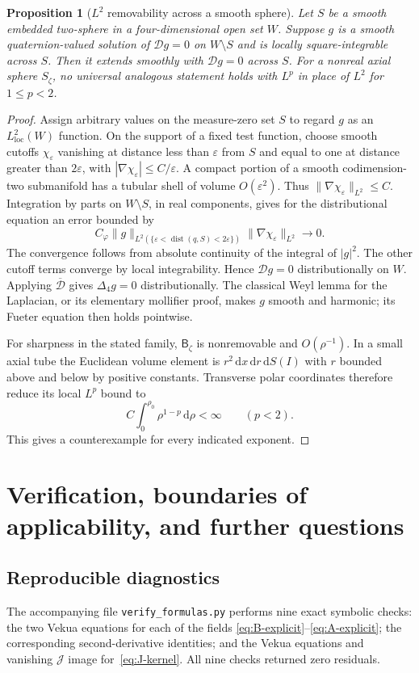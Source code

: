\documentclass[11pt,a4paper]{article}
\numberwithin{equation}{section}
\newtheorem{proposition}[theorem]{Proposition}
\theoremstyle{definition}
\theoremstyle{remark}
\newcommand{\J}{\mathcal J}
\newcommand{\D}{\mathcal D}
\newcommand{\Lap}{\Delta_4}
\newcommand{\dd}{\,\mathrm d}
\newcommand{\dx}{\,\mathrm dx}
\newcommand{\dr}{\,\mathrm dr}
\newcommand{\Bdef}{\mathsf B}
\newcommand{\norm}[1]{\lVert #1\rVert}
\DeclareMathOperator{\dist}{dist}
\begin{document}
\begin{proposition}[$L^2$ removability across a smooth sphere]
\label{prop:L2}
Let $S$ be a smooth embedded two-sphere in a four-dimensional open set
$W$. Suppose $g$ is a smooth quaternion-valued solution of $\D g=0$
on $W\setminus S$ and is locally square-integrable across $S$.
Then it extends smoothly with $\D g=0$ across $S$.
For a nonreal axial sphere $S_\zeta$, no universal analogous statement
holds with $L^p$ in place of $L^2$ for $1\le p<2$.
\end{proposition}
\begin{proof}
Assign arbitrary values on the measure-zero set $S$ to regard $g$ as
an $L^2_{\mathrm{loc}}(W)$ function. On the support of a fixed test
function, choose smooth cutoffs $\chi_\varepsilon$ vanishing at distance
less than $\varepsilon$ from $S$ and equal to one at distance greater
than $2\varepsilon$, with
$|\nabla\chi_\varepsilon|\le C/\varepsilon$.
A compact portion of a smooth codimension-two submanifold has a tubular
shell of volume $O(\varepsilon^2)$. Thus
$\norm{\nabla\chi_\varepsilon}_{L^2}\le C$.
Integration by parts on $W\setminus S$, in real components, gives for
the distributional equation an error bounded by
\[
 C_\varphi\norm{g}_{L^2(\{\varepsilon<\dist(q,S)<2\varepsilon\})}
       \norm{\nabla\chi_\varepsilon}_{L^2}\longrightarrow0.
\]
The convergence follows from absolute continuity of the integral of
$|g|^2$. The other cutoff terms converge by local integrability.
Hence $\D g=0$ distributionally on $W$. Applying $\overline{\D}$
gives $\Lap g=0$ distributionally. The classical Weyl lemma for the
Laplacian, or its elementary mollifier proof, makes $g$ smooth and
harmonic; its Fueter equation then holds pointwise.

For sharpness in the stated family, $\Bdef_\zeta$ is nonremovable and
$O(\rho^{-1})$. In a small axial tube the Euclidean volume element is
$r^2\dx\dr\dd S(I)$ with $r$ bounded above and below by positive
constants. Transverse polar coordinates therefore reduce its local
$L^p$ bound to
\[
 C\int_0^{\rho_0}\rho^{1-p}\dd\rho<\infty\qquad(p<2).
\]
This gives a counterexample for every indicated exponent.
\end{proof}

\section{Verification, boundaries of applicability, and further questions}
\label{sec:verification}

\subsection{Reproducible diagnostics}
The accompanying file \texttt{verify\_formulas.py} performs nine exact
symbolic checks: the two Vekua equations for each of the fields
\eqref{eq:B-explicit}--\eqref{eq:A-explicit}; the corresponding
second-derivative identities; and the Vekua equations and vanishing
$\J$ image for~\eqref{eq:J-kernel}.
All nine checks returned zero residuals.
\end{document}
